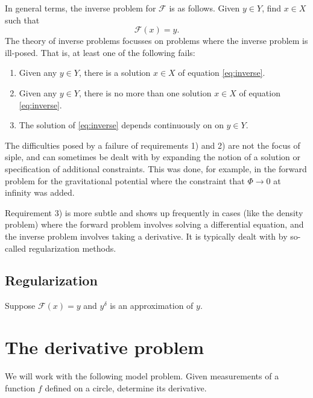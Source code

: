 \documentclass[12pt]{article}
\def\siple{{\sf siple}}
\newcommand{\calF}{\mathcal{F}}
\let\ra\rightarrow
\begin{document}
In general terms, the inverse problem for $\calF$ is as follows.  Given $y\in Y$, find $x\in X$ such that
\begin{equation}\label{eq:inverse}
\calF(x) = y.
\end{equation}
The theory of inverse problems focusses on problems where the inverse problem is ill-posed.  That is, at least one of the following fails:
\begin{enumerate} 
    \item Given any $y\in Y$, there is a solution $x\in X$ of equation \eqref{eq:inverse}.
    \item Given any $y\in Y$, there is no more than one solution $x\in X$ of equation \eqref{eq:inverse}.
    \item The solution of \eqref{eq:inverse} depends continuously on on $y\in Y$.
\end{enumerate}
The difficulties posed by a failure of requirements 1) and 2) are not the focus of \siple, and can sometimes be dealt with by expanding the notion of a solution or specification of additional constraints.  This was done, for example, in the forward problem for the gravitational potential where the constraint that $\Phi\ra 0$ at infinity was added.

Requirement 3) is more subtle and shows up frequently in cases (like the density problem) where the forward problem involves solving a differential equation, and the inverse problem involves taking a derivative.  It is 
typically dealt with by so-called regularization methods.

\subsection{Regularization}

Suppose $\calF(x)=y$ and $y^\delta$ is an approximation of $y$.



\section{The derivative problem}

We will work with the following model problem.  Given measurements
of a function $f$ defined on a circle, determine its derivative.
\end{document}
